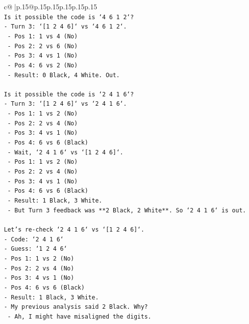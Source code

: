 \documentclass{article}
\begin{document}
{\begin{supertabular}{c@{$\;$}|p{.15\linewidth}@{}p{.15\linewidth}p{.15\linewidth}p{.15\linewidth}p{.15\linewidth}p{.15\linewidth}}
{{{\\ 
\texttt{Is it possible the code is `4 6 1 2`?} \\
\texttt{{-} Turn 3: `{[}1 2 4 6{]}` vs `4 6 1 2`.} \\
\texttt{  {-} Pos 1: 1 vs 4 (No)} \\
\texttt{  {-} Pos 2: 2 vs 6 (No)} \\
\texttt{  {-} Pos 3: 4 vs 1 (No)} \\
\texttt{  {-} Pos 4: 6 vs 2 (No)} \\
\texttt{  {-} Result: 0 Black, 4 White. Out.} \\
\\ 
\texttt{Is it possible the code is `2 4 1 6`?} \\
\texttt{{-} Turn 3: `{[}1 2 4 6{]}` vs `2 4 1 6`.} \\
\texttt{  {-} Pos 1: 1 vs 2 (No)} \\
\texttt{  {-} Pos 2: 2 vs 4 (No)} \\
\texttt{  {-} Pos 3: 4 vs 1 (No)} \\
\texttt{  {-} Pos 4: 6 vs 6 (Black)} \\
\texttt{  {-} Wait, `2 4 1 6` vs `{[}1 2 4 6{]}`.} \\
\texttt{  {-} Pos 1: 1 vs 2 (No)} \\
\texttt{  {-} Pos 2: 2 vs 4 (No)} \\
\texttt{  {-} Pos 3: 4 vs 1 (No)} \\
\texttt{  {-} Pos 4: 6 vs 6 (Black)} \\
\texttt{  {-} Result: 1 Black, 3 White.} \\
\texttt{  {-} But Turn 3 feedback was **2 Black, 2 White**. So `2 4 1 6` is out.} \\
\\ 
\texttt{Let's re{-}check `2 4 1 6` vs `{[}1 2 4 6{]}`.} \\
\texttt{{-} Code: `2 4 1 6`} \\
\texttt{{-} Guess: `1 2 4 6`} \\
\texttt{{-} Pos 1: 1 vs 2 (No)} \\
\texttt{{-} Pos 2: 2 vs 4 (No)} \\
\texttt{{-} Pos 3: 4 vs 1 (No)} \\
\texttt{{-} Pos 4: 6 vs 6 (Black)} \\
\texttt{{-} Result: 1 Black, 3 White.} \\
\texttt{{-} My previous analysis said 2 Black. Why?} \\
\texttt{  {-} Ah, I might have misaligned the digits.} \\
}}}
\end{supertabular}}
\end{document}
